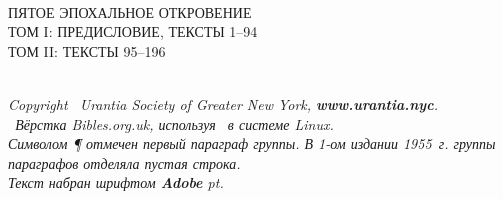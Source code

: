\begin{center}
\bibcovertitlefont\urantiabook\\[3ex]
\LARGE ПЯТОЕ ЭПОХАЛЬНОЕ ОТКРОВЕНИЕ\\
\ifmultivol
\Large
\ifvoli ТОМ I: ПРЕДИСЛОВИЕ, ТЕКСТЫ 1--94\\\fi
\ifvolii ТОМ II: ТЕКСТЫ 95--196\\\fi
\fi
{}
\titlesepbig\\
\end{center}

\titleframe

\newpage

\begin{center}
\begin{center}\end{center}
\itshape
{}
Copyright \textcopyright\ Urantia Society of Greater New York, {\upshape\bfseries www.urantia.nyc}.\\
\tux\ Вёрстка Bibles.org.uk, используя \XeLaTeX\ в системе Linux.\\
Символом {\upshape \P} отмечен первый параграф группы. В 1-ом издании 1955~г. группы параграфов отделяла пустая строка.\\
Текст набран шрифтом \textbf{Adobe \urantiamainfont} \urantiamainfontsize pt.\\[4pt]
\upshape\normalsize\bfseries\mytoday{}\\
\end{center}

\titleframe
